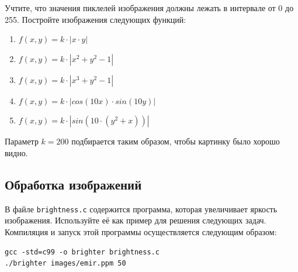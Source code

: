 \documentclass{article}
\begin{document}
\begin{itemize}
Учтите, что значения пиклелей изображения должны лежать в интервале от 0 до 255. Постройте изображения следующих функций: 
\begin{enumerate}
\item $f(x, y) = k\cdot|x \cdot y|$
\item $f(x, y) = k\cdot|x^2 + y^2 - 1|$
\item $f(x, y) = k\cdot|x^3 + y^2 - 1|$
\item $f(x, y) = k\cdot|cos(10x)\cdot sin(10y)|$
\item $f(x, y) = k\cdot|sin(10\cdot(y^2 + x))|$
\end{enumerate}
Параметр $k = 200$ подбирается таким образом, чтобы картинку было хорошо видно.
\end{itemize}
\newpage
\subsection*{Обработка изображений}
В файле \texttt{brightness.c} содержится программа, которая увеличивает яркость изображения. Используйте её как пример для решения следующих задач. Компиляция и запуск этой программы осуществляется следующим образом:
\begin{verbatim}
gcc -std=c99 -o brighter brightness.c
./brighter images/emir.ppm 50
\end{verbatim}
\end{document}
